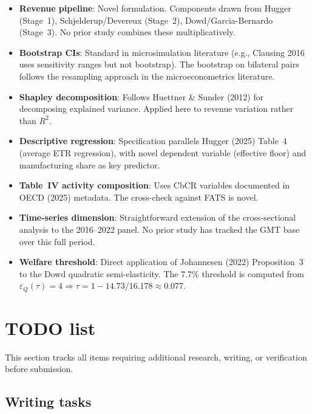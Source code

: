 \documentclass[11pt,a4paper]{article}
\begin{document}
\begin{itemize}[noitemsep]
\item \textbf{Revenue pipeline}: Novel formulation. Components drawn from Hugger (Stage~1), Schjelderup/Devereux (Stage~2), Dowd/Garcia-Bernardo (Stage~3). No prior study combines these multiplicatively.
\item \textbf{Bootstrap CIs}: Standard in microsimulation literature (e.g., Clausing 2016 uses sensitivity ranges but not bootstrap). The bootstrap on bilateral pairs follows the resampling approach in the microeconometrics literature.
\item \textbf{Shapley decomposition}: Follows Huettner \& Sunder (2012) for decomposing explained variance. Applied here to revenue variation rather than $R^2$.
\item \textbf{Descriptive regression}: Specification parallels Hugger (2025) Table~4 (average ETR regression), with novel dependent variable (effective floor) and manufacturing share as key predictor.
\item \textbf{Table~IV activity composition}: Uses CbCR variables documented in OECD (2025) metadata. The cross-check against FATS is novel.
\item \textbf{Time-series dimension}: Straightforward extension of the cross-sectional analysis to the 2016--2022 panel. No prior study has tracked the GMT base over this full period.
\item \textbf{Welfare threshold}: Direct application of Johannesen (2022) Proposition~3 to the Dowd quadratic semi-elasticity. The 7.7\% threshold is computed from $\varepsilon_Q(\tau) = 4 \Rightarrow \tau = 1 - 14.73/16.178 \approx 0.077$.
\end{itemize}

\section{TODO list}\label{w:todos}

This section tracks all items requiring additional research, writing, or verification before submission.

\subsection{Writing tasks}
\end{document}
